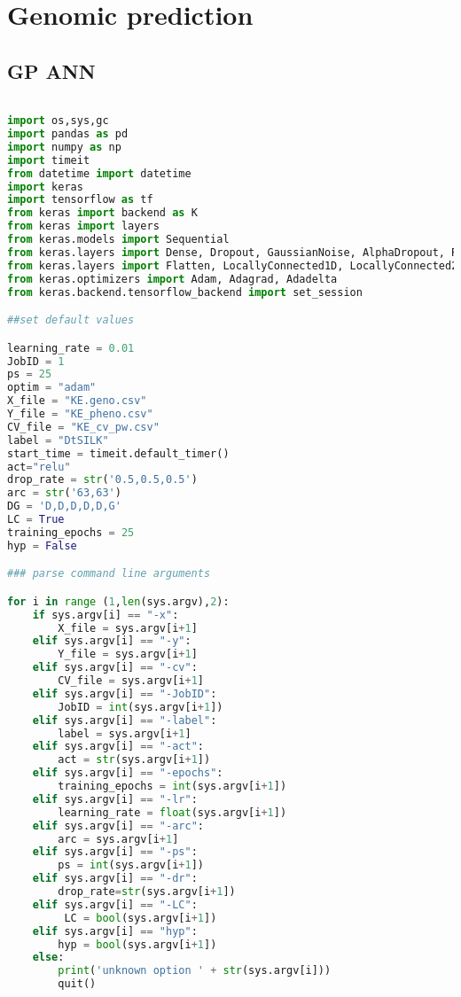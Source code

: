 

\chapter{Genomic prediction} %

\label{AppendixC} %

\section{GP ANN}
\begin{lstlisting}[language=Python]

import os,sys,gc
import pandas as pd
import numpy as np
import timeit
from datetime import datetime
import keras
import tensorflow as tf
from keras import backend as K
from keras import layers
from keras.models import Sequential
from keras.layers import Dense, Dropout, GaussianNoise, AlphaDropout, Reshape
from keras.layers import Flatten, LocallyConnected1D, LocallyConnected2D
from keras.optimizers import Adam, Adagrad, Adadelta
from keras.backend.tensorflow_backend import set_session 

##set default values

learning_rate = 0.01
JobID = 1
ps = 25
optim = "adam"
X_file = "KE.geno.csv"
Y_file = "KE_pheno.csv"
CV_file = "KE_cv_pw.csv"
label = "DtSILK"
start_time = timeit.default_timer()
act="relu"
drop_rate = str('0.5,0.5,0.5')
arc = str('63,63')
DG = 'D,D,D,D,D,G'
LC = True
training_epochs = 25
hyp = False

### parse command line arguments

for i in range (1,len(sys.argv),2):
    if sys.argv[i] == "-x":
        X_file = sys.argv[i+1]
    elif sys.argv[i] == "-y":
        Y_file = sys.argv[i+1]
    elif sys.argv[i] == "-cv":
        CV_file = sys.argv[i+1]
    elif sys.argv[i] == "-JobID":
        JobID = int(sys.argv[i+1])
    elif sys.argv[i] == "-label":
        label = sys.argv[i+1]
    elif sys.argv[i] == "-act":
        act = str(sys.argv[i+1])
    elif sys.argv[i] == "-epochs":
        training_epochs = int(sys.argv[i+1])
    elif sys.argv[i] == "-lr":
        learning_rate = float(sys.argv[i+1])
    elif sys.argv[i] == "-arc":
        arc = sys.argv[i+1]
    elif sys.argv[i] == "-ps":
        ps = int(sys.argv[i+1])
    elif sys.argv[i] == "-dr":
        drop_rate=str(sys.argv[i+1])
    elif sys.argv[i] == "-LC":
         LC = bool(sys.argv[i+1])
    elif sys.argv[i] == "hyp":
        hyp = bool(sys.argv[i+1])
    else:
        print('unknown option ' + str(sys.argv[i]))
        quit()
       

\end{lstlisting}
